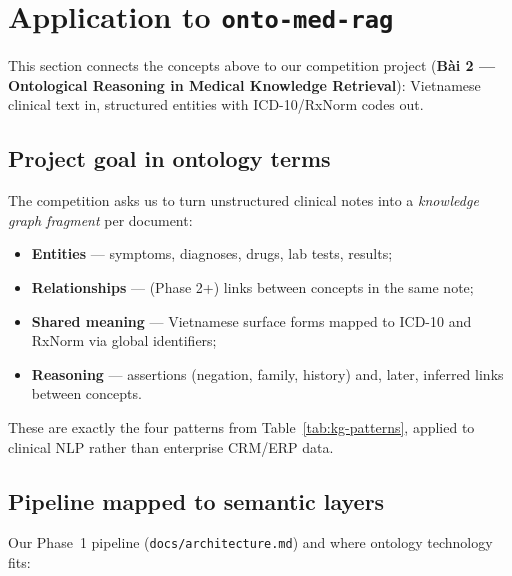 \section{Application to \texttt{onto-med-rag}}

This section connects the concepts above to our competition project
(\textbf{Bài 2 --- Ontological Reasoning in Medical Knowledge Retrieval}):
Vietnamese clinical text in, structured entities with ICD-10/RxNorm codes out.

\subsection{Project goal in ontology terms}

The competition asks us to turn unstructured clinical notes into a \emph{knowledge
graph fragment} per document:

\begin{itemize}
  \item \textbf{Entities} --- symptoms, diagnoses, drugs, lab tests, results;
  \item \textbf{Relationships} --- (Phase 2+) links between concepts in the same note;
  \item \textbf{Shared meaning} --- Vietnamese surface forms mapped to ICD-10 and
        RxNorm via global identifiers;
  \item \textbf{Reasoning} --- assertions (negation, family, history) and, later,
        inferred links between concepts.
\end{itemize}

These are exactly the four patterns from Table~\ref{tab:kg-patterns}, applied to
clinical NLP rather than enterprise CRM/ERP data.

\subsection{Pipeline mapped to semantic layers}

Our Phase~1 pipeline (\texttt{docs/architecture.md}) and where ontology technology
fits:

